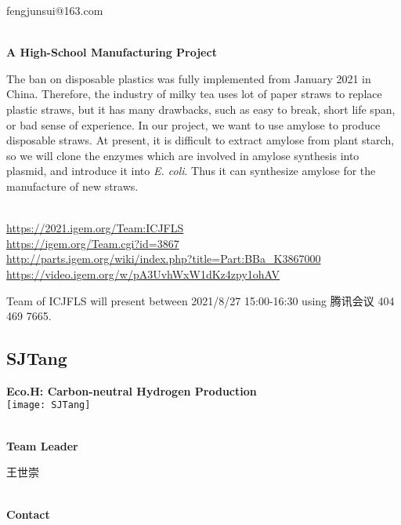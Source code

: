   fengjunsui@163.com


\textbf{\\A High-School Manufacturing Project\\}\begin{spacing}{1.5}

The ban on disposable plastics was fully implemented from January 2021 in China. Therefore, the industry of milky tea uses lot of paper straws to replace plastic straws, but it has many drawbacks, such as easy to break, short life span, or bad sense of experience. In our project, we want to use amylose to produce disposable straws. At present, it is difficult to extract amylose from plant starch, so we will clone the enzymes which are involved in amylose synthesis into plasmid, and introduce it into \textit{E. coli}. Thus it can synthesize amylose for the manufacture of new straws.\end{spacing}
\\

\url{https://2021.igem.org/Team:ICJFLS }\\
\url{https://igem.org/Team.cgi?id=3867 }\\
\url{http://parts.igem.org/wiki/index.php?title=Part:BBa_K3867000 }\\
\url{https://video.igem.org/w/pA3UvhWxW1dKz4zpy1ohAV }\\

\vfill{}









Team of ICJFLS will present between  2021/8/27 15:00-16:30       using 腾讯会议 404 469 7665.
\newpage


\subsection{\textcolor{Blu}{ SJTang } }
\vspace{5mm}
\begin{center}
\large{
  \textbf{ Eco.H: Carbon-neutral Hydrogen Production }\\

  \texttt{[image: SJTang]}
}
\end{center}
\textbf{\\Team Leader}

  王世崇


\textbf{\\Contact}

